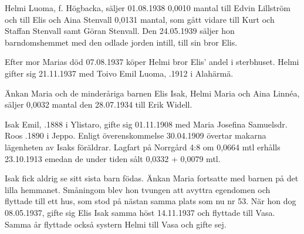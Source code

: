 %
Helmi Luoma, f. Högbacka, säljer 01.08.1938 0,0010 mantal till Edvin Lillström och till Elis och Aina Stenvall 0,0131 mantal, som gått vidare till Kurt och Staffan Stenvall samt Göran Stenvall. Den 24.05.1939 säljer hon barndomshemmet med den odlade jorden intill, till sin bror Elis.


%
Efter mor Marias död 07.08.1937 köper Helmi bror Elis' andel i sterbhuset. Helmi gifter sig 21.11.1937 med Toivo Emil Luoma, .1912 i Alahärmä.\jhvspace{}


%
Änkan Maria och de minderåriga barnen Elis Isak, Helmi Maria och Aina Linnéa, säljer 0,0032 mantal den 28.07.1934 till Erik Widell.\jhvspace{}


%
Isak Emil, .1888 i Ylistaro, gifte sig 01.11.1908 med Maria Josefina Samuelsdr. Roos .1890 i Jeppo. Enligt överenskommelse 30.04.1909 övertar makarna lägenheten av Isaks föräldrar. Lagfart på Norrgård 4:8 om 0,0664 mtl erhålls 23.10.1913 emedan de under tiden sålt 0,0332 + 0,0079 mtl.
\begin{jhchildren}
  \item {}
  \item {}
  \item {}
  \item {}
  \item {}
\end{jhchildren}
Isak fick aldrig se sitt sista barn födas. Änkan Maria fortsatte med barnen på det lilla hemmanet. Småningom blev hon tvungen att avyttra egendomen och flyttade till ett hus, som stod på nästan samma plats som nu nr 53. När hon dog 08.05.1937, gifte sig Elis Isak samma höst 14.11.1937 och flyttade till Vasa. Samma år flyttade också systern Helmi till Vasa och gifte sej.


